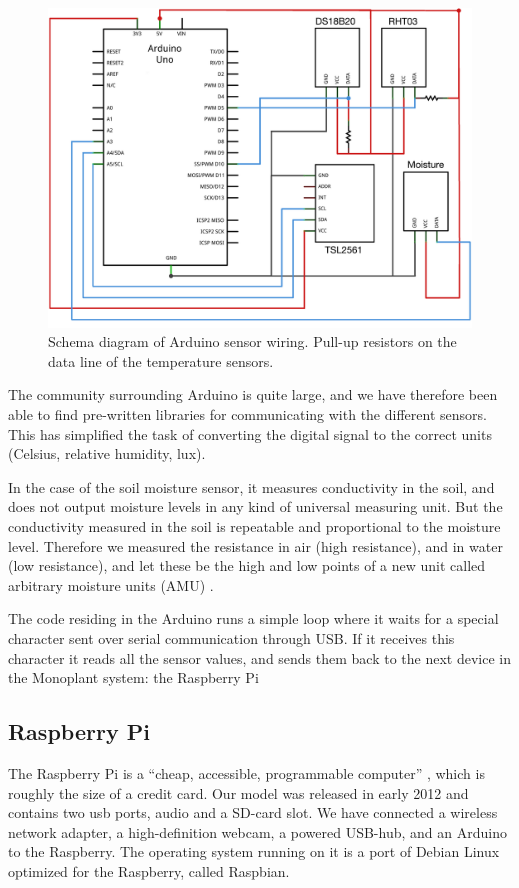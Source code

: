 \begin{figure}
\centering
\includegraphics[width=1\textwidth]{img/hardware/Arduino_and_sensors_schem.png}
\caption{Schema diagram of Arduino sensor wiring. Pull-up resistors on the data line of the temperature sensors.} %
\label{fig:Arduino}
\end{figure}

The community surrounding Arduino is quite large, and we have therefore been able to find pre-written libraries for communicating with the different sensors. This has simplified the task of converting the digital signal to the correct units (Celsius, relative humidity, lux). 

In the case of the soil moisture sensor, it measures conductivity in the soil, and does not output moisture levels in any kind of universal measuring unit. But the conductivity measured in the soil is repeatable and proportional to the moisture level. Therefore we measured the resistance in air (high resistance), and in water (low resistance), and let these be the high and low points of a new unit called arbitrary moisture units (AMU) \citep{ch00ftech}.

The code residing in the Arduino runs a simple loop where it waits for a special character sent over serial communication through USB. If it receives this character it reads all the sensor values, and sends them back to the next device in the Monoplant system: the Raspberry Pi

\subsection{Raspberry Pi}
The Raspberry Pi is a “cheap, accessible, programmable computer” \citep{Raspberrypi}, which is roughly the size of a credit card. Our model was released in early 2012 and contains two usb ports, audio and a SD-card slot. We have connected a wireless network adapter, a high-definition webcam, a powered USB-hub, and an Arduino to the Raspberry. The operating system running on it is a port of Debian Linux optimized for the Raspberry, called Raspbian. 

